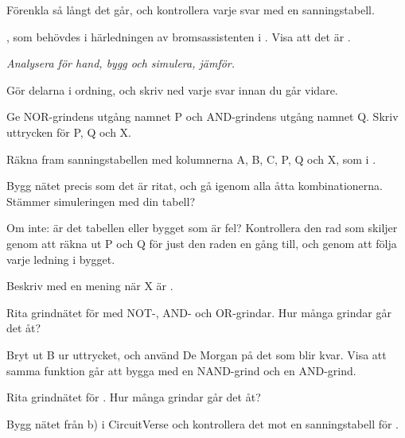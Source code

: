 \label{c2:ex:6}
Förenkla så långt det går, och kontrollera varje svar med en sanningstabell.
\begin{parts}
  \item {}
  \item {}
  \item \mbox{}, som behövdes i härledningen av bromsassistenten i
    . Visa att det är \mbox{}.
  \item {}
\end{parts}

\label{c2:ex:7}
\emph{Analysera för hand, bygg och simulera, jämför.}


\noindent Gör delarna i ordning, och skriv ned varje svar innan du går vidare.

Ge NOR-grindens utgång namnet P och AND-grindens utgång namnet Q. Skriv uttrycken för P, Q och X.

Räkna fram sanningstabellen med kolumnerna A, B, C, P, Q och X, som i .

Bygg nätet precis som det är ritat, och gå igenom alla åtta kombinationerna. Stämmer simuleringen
med din tabell?

Om inte: är det tabellen eller bygget som är fel? Kontrollera den rad som skiljer genom att räkna ut
P och Q för just den raden en gång till, och genom att följa varje ledning i bygget.

Beskriv med en mening när X är .

\label{c2:ex:8}
\begin{parts}
  \item Rita grindnätet för \mbox{} med NOT-, AND- och OR-grindar. Hur många
    grindar går det åt?
  \item Bryt ut B ur uttrycket, och använd De Morgan på det som blir kvar. Visa att samma funktion
    går att bygga med en NAND-grind och en AND-grind.
  \item Rita grindnätet för \mbox{}. Hur många grindar går det åt?
  \item Bygg nätet från b) i CircuitVerse och kontrollera det mot en sanningstabell för
    \mbox{}.
\end{parts}


